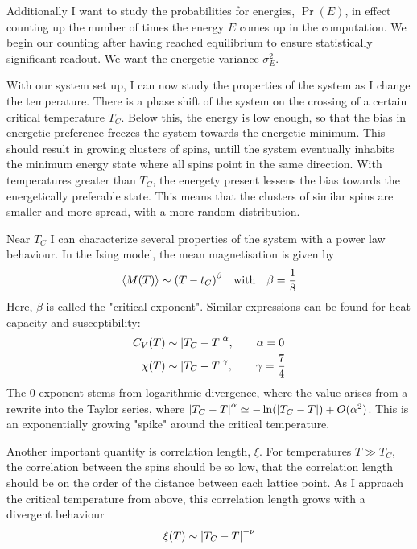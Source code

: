 \documentclass[10pt, twocolumn]{revtex4-1}
\begin{document}
Additionally I want to study the probabilities for energies, $\Pr(E)$, in effect counting up the number of times the energy $E$ comes up in the computation.
We begin our counting after having reached equilibrium to ensure statistically significant readout. We want the energetic variance $\sigma_E^2$.

With our system set up, I can now study the properties of the system as I change the temperature. There is a phase shift of the system on the crossing of
a certain critical temperature $T_C$. Below this, the energy is low enough, so that the bias in energetic preference freezes the system towards the energetic
minimum. This should result in growing clusters of spins, untill the system eventually inhabits the minimum energy state where all spins point in the same
direction. With temperatures greater than $T_C$, the energety present lessens the bias towards the energetically preferable state. This means that the clusters
of similar spins are smaller and more spread, with a more random distribution.

Near $T_C$ I can characterize several properties of the system with a power law behaviour. In the Ising model, the mean magnetisation is given by
\[ \ev{M(T)} \sim \qty( T - t_C )^{\beta} \qq{with} \beta = \frac{1}{8} \]
Here, $\beta$ is called the "critical exponent". %
Similar expressions can be found for heat capacity and susceptibility:
\begin{align*}
    C_V(T) &\sim \qty| T_C - T |^{\alpha}, \qq{} \alpha = 0 \\
    \chi(T) &\sim \qty| T_C - T |^{\gamma}, \qq{} \gamma = \frac{7}{4}
\end{align*}
The 0 exponent stems from logarithmic divergence, where the value
arises from a rewrite into the Taylor series, where $\qty| T_C - T |^{\alpha} \simeq -\ln(\qty| T_C - T | ) + O(\alpha^2)$. This is an exponentially growing
"spike" around the critical temperature.


Another important quantity is correlation length, $\xi$. For temperatures $T \gg T_C$, the correlation between the spins should be so low, that the
correlation length should be on the order of the distance between each lattice point. As I approach the critical temperature from above, this correlation
length grows with a divergent behaviour
\[ \xi(T) \sim \qty| T_C - T |^{-\nu} \]
\end{document}
